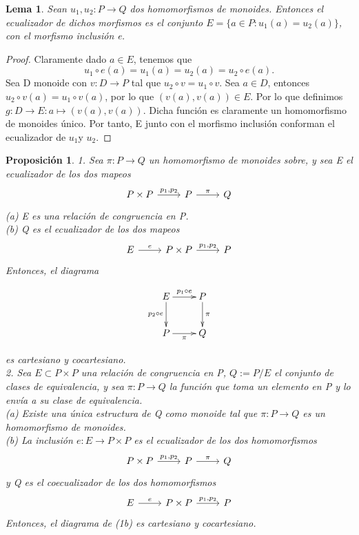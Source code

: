 \documentclass[12pt,spanish]{amsart}
\newcommand{\sqrd}[8]{
 \xymatrix{%
 {#1} \ar[r]^-{#5}\ar[d]_-{#8} & {#2}\ar[d]^-{#6} \\ %
 {#4}\ar[r]_-{#7} & {#3} %
 }%
 } %
\newtheorem{prop}[Theorem]{Proposición}
\newtheorem{lem}[Theorem]{Lema}
\theoremstyle{definition}
\theoremstyle{remark}
\begin{document}
\begin{lem}
Sean $u_{1},u_{2}:P \to Q$ dos homomorfismos de monoides. Entonces el ecualizador de dichos morfismos es el conjunto $E=\{a\in P:u_{1}(a)=u_{2}(a)\}$, con el morfismo inclusión e.
\end{lem}

\begin{proof}
Claramente dado $a\in E$, tenemos que 
$$u_{1}\circ e(a)= u_{1}(a) = u_{2}(a) = u_{2}\circ e(a).$$
Sea D monoide con $v:D \to P$ tal que $u_{2}\circ v = u_{1}\circ v$. Sea $a\in D$, entonces $u_{2}\circ v(a) = u_{1}\circ v(a)$, por lo que $(v(a),v(a))\in E$. Por lo que definimos $g:D \to E:a \mapsto (v(a),v(a))$. Dicha función es claramente un homomorfismo de monoides único. Por tanto, E junto con el morfismo inclusión conforman el ecualizador de $u_{1}$y $u_{2}$.
\end{proof}

\begin{prop}
1. Sea $\pi: P \to Q$ un homomorfismo de monoides sobre, y sea E el ecualizador de los dos mapeos 
$$\begin{tikzcd}
    P\times P \arrow{r}{p_{1},p_{2}} & P\arrow{r}{\pi} & Q
\end{tikzcd}$$
(a) E es una relación de congruencia en P. \\
(b) Q es el ecualizador de los dos mapeos
$$\begin{tikzcd}
    E \arrow{r}{e} & P\times P \arrow{r}{p_{1},p_{2}} & P
\end{tikzcd}$$
Entonces, el diagrama

$$\sqrd {E}{P}{Q}{P}{p_{1} \circ e}{\pi}{\pi}{p_{2} \circ e}$$

es cartesiano y cocartesiano. \\
2. Sea $E \subset P\times P$ una relación de congruencia en P, $Q:= P/E$ el conjunto de clases de equivalencia, y sea $\pi:P \to Q$ la función que toma un elemento en P y lo envía a su clase de equivalencia. \\
(a) Existe una única estructura de Q como monoide tal que $\pi:P \to Q$ es un homomorfismo de monoides. \\
(b) La inclusión $e:E \to P\times P$ es el ecualizador de los dos homomorfismos 
$$\begin{tikzcd}
    P\times P \arrow{r}{p_{1},p_{2}} & P\arrow{r}{\pi} & Q
\end{tikzcd}$$
y Q es el coecualizador de los dos homomorfismos 
$$\begin{tikzcd}
    E \arrow{r}{e} & P\times P \arrow{r}{p_{1},p_{2}} & P
\end{tikzcd}$$
Entonces, el diagrama de (1b) es cartesiano y cocartesiano. \\
\end{prop}
\end{document}
